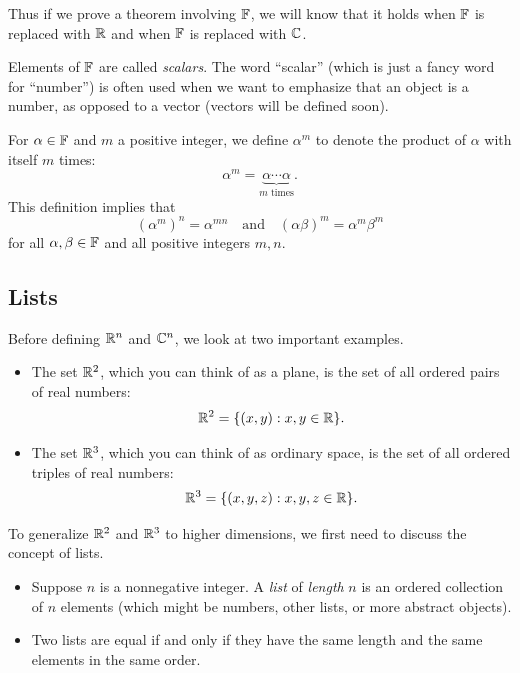 %
Thus if we prove a theorem involving $\mathbb{F}$, we will know that it holds when
$\mathbb{F}$ is replaced with $\mathbb{R}$ and when $\mathbb{F}$ is replaced with $\mathbb{C}$.

Elements of $\mathbb{F}$ are called \emph{scalars}. The word ``scalar'' (which is just
a fancy word for ``number'') is often used when we want to emphasize that an
object is a number, as opposed to a vector (vectors will be defined soon).

For $\alpha\in\mathbb{F}$ and $m$ a positive integer, we define $\alpha^m$ to denote
the product of $\alpha$ with itself $m$ times:
\[ \alpha^m = \underbrace{\alpha\cdots\alpha}_{m\text{ times}}. \]
This definition implies that
\[ (\alpha^m)^n = \alpha^{mn} \quad\text{and}\quad (\alpha\beta)^m = \alpha^m\beta^m \]
for all $\alpha,\beta\in\mathbb{F}$ and all positive integers $m,n$.

\subsection{Lists}

Before defining $\mathbb{R}^n$ and $\mathbb{C}^n$, we look at two important examples.

\begin{example}[$\R^2$ and $\R^3$]\label{ax:1.7}\leavevmode
\begin{itemize}
\item The set $\R^2$, which you can think of as a plane, is the set of all
  ordered pairs of real numbers:
  \[ \mathbb{R}^2 = \{(x,y) : x,y\in\mathbb{R}\}. \]
\item The set $\R^3$, which you can think of as ordinary space, is the set of
  all ordered triples of real numbers:
  \[ \mathbb{R}^3 = \{(x,y,z) : x,y,z\in\mathbb{R}\}. \]
\end{itemize}
\end{example}

To generalize $\R^2$ and $\R^3$ to higher dimensions, we first need to discuss
the concept of lists.

\begin{definition}\label{ax:1.8}\leavevmode
\begin{itemize}
\item Suppose $n$ is a nonnegative integer. A \emph{list} of \emph{length} $n$
  is an ordered collection of $n$ elements (which might be numbers, other
  lists, or more abstract objects).
\item Two lists are equal if and only if they have the same length and the
  same elements in the same order.
\end{itemize}
\end{definition}

